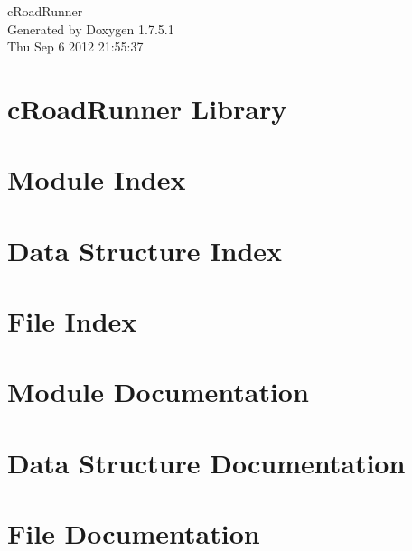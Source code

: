 \documentclass[a4paper]{book}
\begin{document}
\hypersetup{pageanchor=false,citecolor=blue}
\begin{titlepage}
\vspace*{7cm}
\begin{center}
{\Large c\-Road\-Runner }\\
\vspace*{1cm}
{\large \-Generated by Doxygen 1.7.5.1}\\
\vspace*{0.5cm}
{\small Thu Sep 6 2012 21:55:37}\\
\end{center}
\end{titlepage}
\clearemptydoublepage
{}
\tableofcontents
\clearemptydoublepage
{}
\hypersetup{pageanchor=true,citecolor=blue}
\chapter{c\-Road\-Runner \-Library}
\label{index}\hypertarget{index}{}
\chapter{\-Module \-Index}

\chapter{\-Data \-Structure \-Index}

\chapter{\-File \-Index}

\chapter{\-Module \-Documentation}

















\chapter{\-Data \-Structure \-Documentation}










\chapter{\-File \-Documentation}




\printindex
\end{document}
